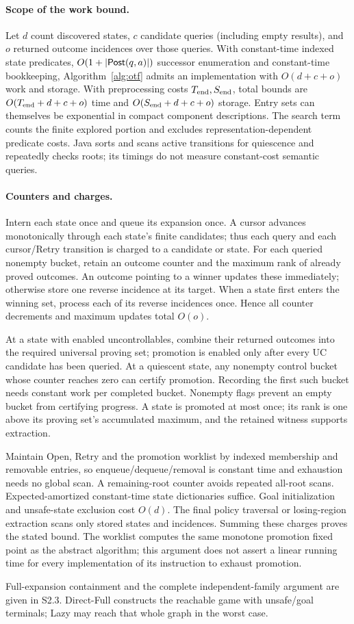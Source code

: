 \paragraph{Scope of the work bound.}
Let $d$ count discovered states, $c$ candidate queries (including empty results), and $o$ returned outcome incidences over those queries. With constant-time indexed state predicates, $O(1+|\mathsf{Post}(q,a)|)$ successor enumeration and constant-time bookkeeping, Algorithm~\ref{alg:otf} admits an implementation with $O(d+c+o)$ work and storage. With preprocessing costs $T_{\rm end},S_{\rm end}$, total bounds are $O(T_{\rm end}+d+c+o)$ time and $O(S_{\rm end}+d+c+o)$ storage. Entry sets can themselves be exponential in compact component descriptions. The search term counts the finite explored portion and excludes representation-dependent predicate costs. Java sorts and scans active transitions for quiescence and repeatedly checks roots; its timings do not measure constant-cost semantic queries.

\paragraph{Counters and charges.}
Intern each state once and queue its expansion once. A cursor advances monotonically through each state's finite candidates; thus each query and each cursor/Retry transition is charged to a candidate or state. For each queried nonempty bucket, retain an outcome counter and the maximum rank of already proved outcomes. An outcome pointing to a winner updates these immediately; otherwise store one reverse incidence at its target. When a state first enters the winning set, process each of its reverse incidences once. Hence all counter decrements and maximum updates total $O(o)$.

At a state with enabled uncontrollables, combine their returned outcomes into the required universal proving set; promotion is enabled only after every UC candidate has been queried. At a quiescent state, any nonempty control bucket whose counter reaches zero can certify promotion. Recording the first such bucket needs constant work per completed bucket. Nonempty flags prevent an empty bucket from certifying progress. A state is promoted at most once; its rank is one above its proving set's accumulated maximum, and the retained witness supports extraction.

Maintain Open, Retry and the promotion worklist by indexed membership and removable entries, so enqueue/dequeue/removal is constant time and exhaustion needs no global scan. A remaining-root counter avoids repeated all-root scans. Expected-amortized constant-time state dictionaries suffice. Goal initialization and unsafe-state exclusion cost $O(d)$. The final policy traversal or losing-region extraction scans only stored states and incidences. Summing these charges proves the stated bound. The worklist computes the same monotone promotion fixed point as the abstract algorithm; this argument does not assert a linear running time for every implementation of its instruction to exhaust promotion.

Full-expansion containment and the complete independent-family argument are given in S2.3. Direct-Full constructs the reachable game with unsafe/goal terminals; Lazy may reach that whole graph in the worst case.
